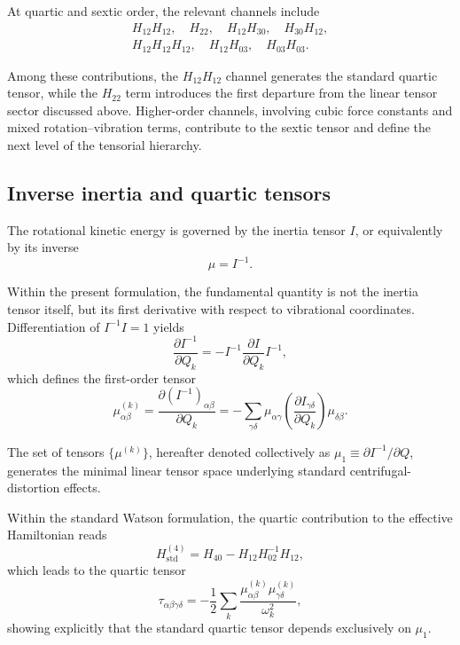 \documentclass[aip,jcp,reprint,floatfix]{revtex4-2}
\begin{document}
At quartic and sextic order, the relevant channels include
\begin{equation}
\begin{aligned}
H_{12}H_{12}, \quad H_{22}, \quad H_{12}H_{30}, \quad H_{30}H_{12}, \\
H_{12}H_{12}H_{12}, \quad H_{12}H_{03}, \quad H_{03}H_{03}.
\end{aligned}
\end{equation}

Among these contributions, the $H_{12}H_{12}$ channel generates the
standard quartic tensor, while the $H_{22}$ term introduces the first
departure from the linear tensor sector discussed above. Higher-order
channels, involving cubic force constants and mixed rotation--vibration
terms, contribute to the sextic tensor and define the next level of the
tensorial hierarchy.


\subsection{Inverse inertia and quartic tensors}

The rotational kinetic energy is governed by the inertia tensor $I$,
or equivalently by its inverse
\begin{equation}
\mu = I^{-1}.
\end{equation}

Within the present formulation, the fundamental quantity is not the
inertia tensor itself, but its first derivative with respect to
vibrational coordinates. Differentiation of $I^{-1} I = 1$ yields
\begin{equation}
\frac{\partial I^{-1}}{\partial Q_k}
=
- I^{-1} \frac{\partial I}{\partial Q_k} I^{-1},
\end{equation}
which defines the first-order tensor
\begin{equation}
\mu^{(k)}_{\alpha\beta}
=
\frac{\partial (I^{-1})_{\alpha\beta}}{\partial Q_k}
=
- \sum_{\gamma\delta}
\mu_{\alpha\gamma}
\left(
\frac{\partial I_{\gamma\delta}}{\partial Q_k}
\right)
\mu_{\delta\beta}.
\end{equation}

The set of tensors $\{\mu^{(k)}\}$, hereafter denoted collectively as
$\mu_1 \equiv \partial I^{-1}/\partial Q$, generates the minimal linear
tensor space underlying standard centrifugal-distortion effects.

Within the standard Watson formulation, the quartic contribution to the
effective Hamiltonian reads
\begin{equation}
H^{(4)}_{\mathrm{std}} =
H_{40}
-
H_{12} H_{02}^{-1} H_{12},
\end{equation}
which leads to the quartic tensor
\begin{equation}
\tau_{\alpha\beta\gamma\delta}
=
- \frac{1}{2}
\sum_k
\frac{
\mu^{(k)}_{\alpha\beta}
\mu^{(k)}_{\gamma\delta}
}{\omega_k^2},
\label{eq:tau_std}
\end{equation}
showing explicitly that the standard quartic tensor depends exclusively
on $\mu_1$.
\end{document}

